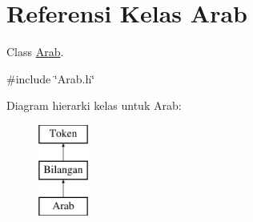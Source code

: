 \hypertarget{classArab}{}\section{Referensi Kelas Arab}
\label{classArab}


Class \hyperlink{classArab}{Arab}.  




{\ttfamily \#include \char`\"{}Arab.\+h\char`\"{}}

Diagram hierarki kelas untuk Arab\+:\begin{figure}[H]
\begin{center}
\leavevmode
\includegraphics[height=3.000000cm]{d0/d70/classArab}
\end{center}
\end{figure}
